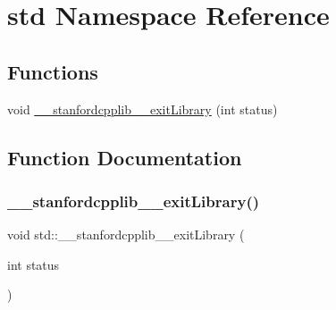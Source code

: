 \hypertarget{namespacestd}{}\section{std Namespace Reference}
\label{namespacestd}
\subsection*{Functions}
\begin{DoxyCompactItemize}
\item 
void \mbox{\hyperlink{namespacestd_a3a53e9409dede08be1eee83805faf538}{\+\_\+\+\_\+stanfordcpplib\+\_\+\+\_\+exit\+Library}} (int status)
\end{DoxyCompactItemize}


\subsection{Function Documentation}
\mbox{\label{namespacestd_a3a53e9409dede08be1eee83805faf538}} 
\subsubsection{\texorpdfstring{\+\_\+\+\_\+stanfordcpplib\+\_\+\+\_\+exit\+Library()}{\_\_stanfordcpplib\_\_exitLibrary()}}
{\footnotesize\ttfamily void std\+::\+\_\+\+\_\+stanfordcpplib\+\_\+\+\_\+exit\+Library (\begin{DoxyParamCaption}\item[{int}]{status }\end{DoxyParamCaption})}

